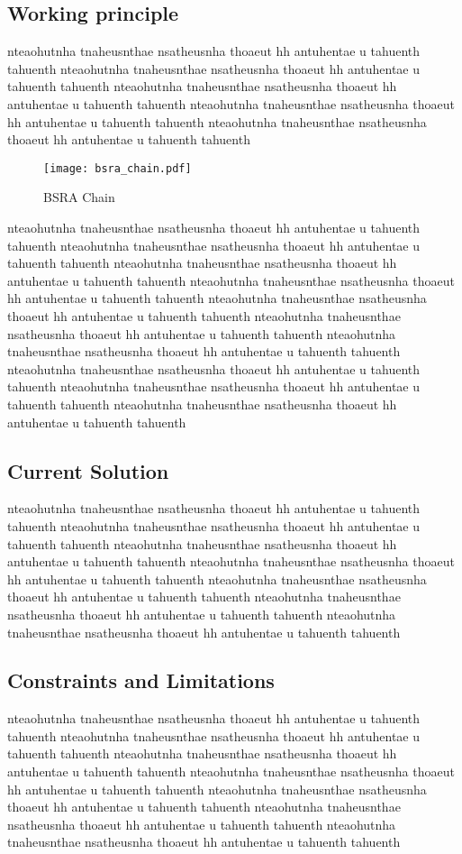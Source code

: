 \subsection{Working principle}
nteaohutnha tnaheusnthae nsatheusnha thoaeut hh antuhentae u tahuenth tahuenth
nteaohutnha tnaheusnthae nsatheusnha thoaeut hh antuhentae u tahuenth tahuenth
nteaohutnha tnaheusnthae nsatheusnha thoaeut hh antuhentae u tahuenth tahuenth
nteaohutnha tnaheusnthae nsatheusnha thoaeut hh antuhentae u tahuenth tahuenth
nteaohutnha tnaheusnthae nsatheusnha thoaeut hh antuhentae u tahuenth tahuenth
\begin{figure}[!tbh]
    \centering
    \texttt{[image: bsra\_chain.pdf]}
    \caption{BSRA Chain}
    \label{fig:bsra_chain}
\end{figure}
nteaohutnha tnaheusnthae nsatheusnha thoaeut hh antuhentae u tahuenth tahuenth
nteaohutnha tnaheusnthae nsatheusnha thoaeut hh antuhentae u tahuenth tahuenth
nteaohutnha tnaheusnthae nsatheusnha thoaeut hh antuhentae u tahuenth tahuenth
nteaohutnha tnaheusnthae nsatheusnha thoaeut hh antuhentae u tahuenth tahuenth
nteaohutnha tnaheusnthae nsatheusnha thoaeut hh antuhentae u tahuenth tahuenth
nteaohutnha tnaheusnthae nsatheusnha thoaeut hh antuhentae u tahuenth tahuenth
nteaohutnha tnaheusnthae nsatheusnha thoaeut hh antuhentae u tahuenth tahuenth
nteaohutnha tnaheusnthae nsatheusnha thoaeut hh antuhentae u tahuenth tahuenth
nteaohutnha tnaheusnthae nsatheusnha thoaeut hh antuhentae u tahuenth tahuenth
nteaohutnha tnaheusnthae nsatheusnha thoaeut hh antuhentae u tahuenth tahuenth

\subsection{Current Solution}
nteaohutnha tnaheusnthae nsatheusnha thoaeut hh antuhentae u tahuenth tahuenth
nteaohutnha tnaheusnthae nsatheusnha thoaeut hh antuhentae u tahuenth tahuenth
nteaohutnha tnaheusnthae nsatheusnha thoaeut hh antuhentae u tahuenth tahuenth
nteaohutnha tnaheusnthae nsatheusnha thoaeut hh antuhentae u tahuenth tahuenth
nteaohutnha tnaheusnthae nsatheusnha thoaeut hh antuhentae u tahuenth tahuenth
nteaohutnha tnaheusnthae nsatheusnha thoaeut hh antuhentae u tahuenth tahuenth
nteaohutnha tnaheusnthae nsatheusnha thoaeut hh antuhentae u tahuenth tahuenth

\subsection{Constraints and Limitations}
nteaohutnha tnaheusnthae nsatheusnha thoaeut hh antuhentae u tahuenth tahuenth
nteaohutnha tnaheusnthae nsatheusnha thoaeut hh antuhentae u tahuenth tahuenth
nteaohutnha tnaheusnthae nsatheusnha thoaeut hh antuhentae u tahuenth tahuenth
nteaohutnha tnaheusnthae nsatheusnha thoaeut hh antuhentae u tahuenth tahuenth
nteaohutnha tnaheusnthae nsatheusnha thoaeut hh antuhentae u tahuenth tahuenth
nteaohutnha tnaheusnthae nsatheusnha thoaeut hh antuhentae u tahuenth tahuenth
nteaohutnha tnaheusnthae nsatheusnha thoaeut hh antuhentae u tahuenth tahuenth

